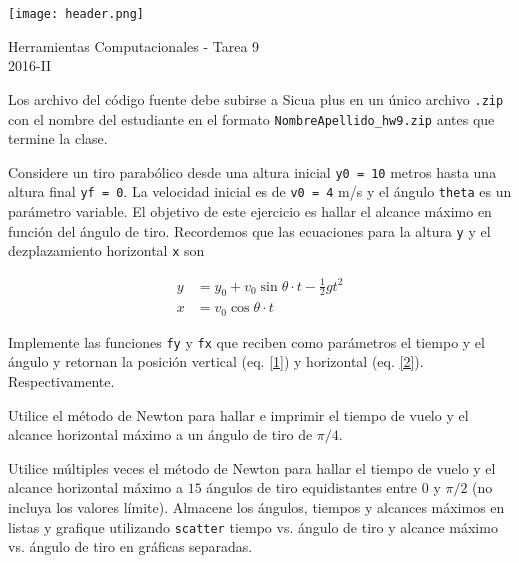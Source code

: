 \documentclass[11pt,letterpaper]{exam}
\begin{document}
\begin{center}

\texttt{[image: header.png]}

\vspace{1.0cm}
{\Large Herramientas Computacionales - Tarea 9}\\
2016-II
\end{center}



\vspace{0.5cm}

\noindent
Los archivo del c\'odigo fuente debe subirse a Sicua plus en un \'unico archivo
\verb".zip" con el nombre del estudiante en el formato \verb"NombreApellido_hw9.zip" antes que termine la clase.


Considere un tiro parab\'olico desde una altura inicial \verb'y0 = 10' metros hasta una altura final \verb'yf = 0'. La velocidad inicial es de \verb'v0 = 4' m/s y el \'angulo \verb'theta' es un par\'ametro variable. El objetivo de este ejercicio es hallar el alcance m\'aximo en funci\'on del \'angulo de tiro. Recordemos que las ecuaciones para la altura \verb'y' y el dezplazamiento horizontal \verb'x' son

\begin{align}
y &= y_0 + v_0\sin\theta \cdot t -\frac{1}{2}gt^2\label{1}\\
x &= v_0\cos\theta \cdot t\label{2}
\end{align}

\vspace{0.5cm}

\begin{questions}
 


Implemente las funciones \verb'fy' y \verb'fx' que reciben como par\'ametros el tiempo y el \'angulo y retornan la posici\'on vertical (eq. \ref{1}) y horizontal (eq. \ref{2}). Respectivamente.


Utilice el m\'etodo de Newton para hallar e imprimir el tiempo de vuelo y el alcance horizontal m\'aximo a un \'angulo de tiro de $\pi/4$.


Utilice m\'ultiples veces el m\'etodo de Newton para hallar el tiempo de vuelo y el alcance horizontal m\'aximo a $15$ \'angulos de tiro equidistantes entre $0$ y $\pi/2$ (no incluya los valores l\'imite). Almacene los \'angulos, tiempos y alcances m\'aximos en listas y grafique utilizando \verb'scatter' tiempo vs. \'angulo de tiro y alcance m\'aximo vs. \'angulo de tiro en gr\'aficas separadas.

\end{questions}
\end{document}
